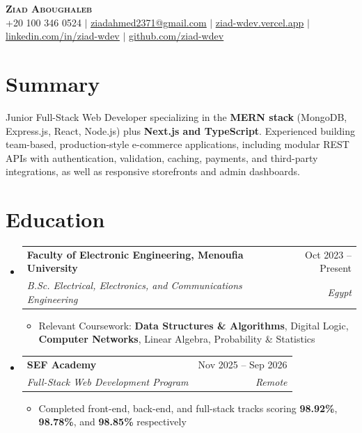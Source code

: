 \documentclass[letterpaper,11pt]{article}
\makeatletter
\newcommand{\resumeItem}[1]{
  \item\small{
    {#1 \vspace{-2pt}}
  }
}
\newcommand{\resumeSubheading}[4]{
  \vspace{-2pt}\item
  \begin{tabular*}{0.97\textwidth}[t]{l@{\extracolsep{\fill}}r}
    \textbf{#1} & #2 \\
    \textit{\small#3} & \textit{\small #4} \\
  \end{tabular*}\vspace{-7pt}
}
\newcommand{\resumeSubHeadingListStart}{\begin{itemize}[leftmargin=0.15in, label={}]}
\newcommand{\resumeSubHeadingListEnd}{\end{itemize}}
\newcommand{\resumeItemListStart}{\begin{itemize}}
\newcommand{\resumeItemListEnd}{\end{itemize}\vspace{-5pt}}
\makeatother
\begin{document}
\begin{center}
  \textbf{\Huge \scshape Ziad Aboughaleb} \\ \vspace{1pt}
  \small +20 100 346 0524 $|$ \href{mailto:ziadahmed2371@gmail.com}{\underline{ziadahmed2371@gmail.com}} $|$
  \href{https://ziad-wdev.vercel.app}{\underline{ziad-wdev.vercel.app}} $|$
  \href{https://linkedin.com/in/ziad-wdev}{\underline{linkedin.com/in/ziad-wdev}} $|$
  \href{https://github.com/ziad-wdev}{\underline{github.com/ziad-wdev}}
\end{center}

\section{Summary}
\small{Junior Full-Stack Web Developer specializing in the \textbf{MERN stack} (MongoDB, Express.js, React, Node.js) plus \textbf{Next.js and TypeScript}. Experienced building team-based, production-style e-commerce applications, including modular REST APIs with authentication, validation, caching, payments, and third-party integrations, as well as responsive storefronts and admin dashboards.}

\section{Education}
  \resumeSubHeadingListStart
    \resumeSubheading
      {Faculty of Electronic Engineering, Menoufia University}{Oct 2023 -- Present}
      {B.Sc. Electrical, Electronics, and Communications Engineering}{Egypt}
      \resumeItemListStart
        \resumeItem{Relevant Coursework: \textbf{Data Structures \& Algorithms}, Digital Logic, \textbf{Computer Networks}, Linear Algebra, Probability \& Statistics}
      \resumeItemListEnd
    \resumeSubheading
      {SEF Academy}{Nov 2025 -- Sep 2026}
      {Full-Stack Web Development Program}{Remote}
      \resumeItemListStart
        \resumeItem{Completed front-end, back-end, and full-stack tracks scoring \textbf{98.92\%}, \textbf{98.78\%}, and \textbf{98.85\%} respectively}
      \resumeItemListEnd
  \resumeSubHeadingListEnd

\end{document}
